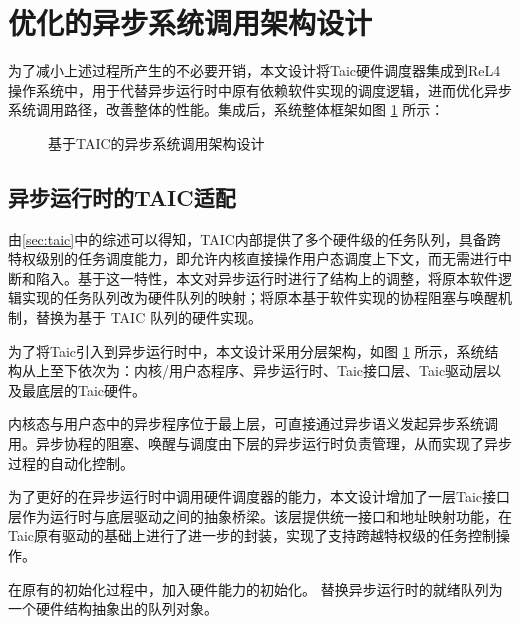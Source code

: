 \section{优化的异步系统调用架构设计}

为了减小上述过程所产生的不必要开销，本文设计将Taic硬件调度器集成到ReL4操作系统中，用于代替异步运行时中原有依赖软件实现的调度逻辑，进而优化异步系统调用路径，改善整体的性能。集成后，系统整体框架如图 \ref{taicsyscall} 所示：

\begin{figure}[htbp]
    \centering
    
    \caption{基于TAIC的异步系统调用架构设计}\label{taicsyscall}
\end{figure}

\subsection{异步运行时的TAIC适配}

由\ref{sec:taic}中的综述可以得知，TAIC内部提供了多个硬件级的任务队列，具备跨特权级别的任务调度能力，即允许内核直接操作用户态调度上下文，而无需进行中断和陷入。基于这一特性，本文对异步运行时进行了结构上的调整，将原本软件逻辑实现的任务队列改为硬件队列的映射；将原本基于软件实现的协程阻塞与唤醒机制，替换为基于 TAIC 队列的硬件实现。


为了将Taic引入到异步运行时中，本文设计采用分层架构，如图 \ref{taicsyscall} 所示，系统结构从上至下依次为：内核/用户态程序、异步运行时、Taic接口层、Taic驱动层以及最底层的Taic硬件。

内核态与用户态中的异步程序位于最上层，可直接通过异步语义发起异步系统调用。异步协程的阻塞、唤醒与调度由下层的异步运行时负责管理，从而实现了异步过程的自动化控制。

为了更好的在异步运行时中调用硬件调度器的能力，本文设计增加了一层Taic接口层作为运行时与底层驱动之间的抽象桥梁。该层提供统一接口和地址映射功能，在Taic原有驱动的基础上进行了进一步的封装，实现了支持跨越特权级的任务控制操作。


在原有的初始化过程中，加入硬件能力的初始化。
替换异步运行时的就绪队列为一个硬件结构抽象出的队列对象。



